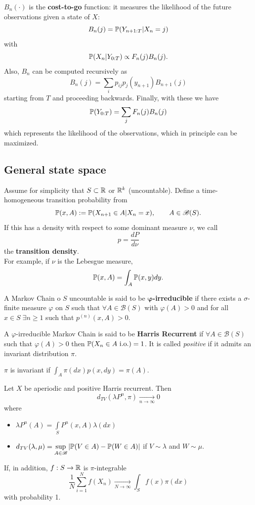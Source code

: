 \documentclass{article}
\begin{document}
$B_n(\cdot)$ is the \textbf{cost-to-go} function: it measures the likelihood of the future observations given a state of $X$:
\[B_n(j)=\mathbb{P}(Y_{n+1:T}|X_n=j)\]
with
\[
\mathbb{P}(X_n|Y_{0:T})\propto F_n(j)B_n(j).
\]
Also, $B_n$ can be computed recursively as
\[B_n(j)=\sum_i p_{ij}p_{j}(y_{n+1})B_{n+1}(j)\]
starting from $T$ and proceeding backwards. Finally, with these we have
\[
\mathbb{P}(Y_{0:T})=\sum_jF_n(j)B_n(j)
\]
which represents the likelihood of the observations, which in principle can be maximized.
\subsection{General state space}
Assume for simplicity that $S\subset\mathbb{R}$ or $\mathbb{R}^k$ (uncountable). Define a time-homogeneous transition probability from 
\[\mathbb{P}(x,A):=\mathbb{P}(X_{n+1}\in A|X_n=x),\qquad A\in\mathscr{B}(S).\]
If this has a density with respect to some dominant measure $\nu$, we call
\[p=\frac{dP}{d\nu}\]
the \textbf{transition density}.\\
For example, if $\nu$ is the Lebesgue measure,
\[\mathbb{P}(x,A)=\int_A \mathbb{P}(x,y)dy.\]
\begin{definition} 
    A Markov Chain o $S$ uncountable is said to be $\mathbf{\varphi}$\textbf{-irreducible} if there exists a $\sigma$-finite measure $\varphi$ on $S$ such that $\forall A\in\mathscr{B}(S)$ with $\varphi(A)>0$ and for all $x\in S\;\exists n\geqslant1$ such that $p^{(n)}(x,A)>0$.
\end{definition}
\begin{definition}
    A $\varphi$-irreducible Markov Chain is said to be \textbf{Harris Recurrent} if $\forall A \in \mathscr{B}(S)$ such that $\varphi(A)>0$ then $\mathbb{P}(X_n\in A \text{ i.o.})=1$. It is called \textit{positive} if it admits an invariant distribution $\pi$.
\end{definition}
$\pi$ is invariant if $\int_A\pi(dx)p(x,dy)=\pi(A)$.
\begin{theorem}
    Let $X$ be aperiodic and positive Harris recurrent. Then
        \[d_{TV}(\lambda P^n,\pi)\xrightarrow[n\to\infty]{}0
        \]
        where
        \begin{itemize}
            \item $\displaystyle\lambda P^n(A)=\int\limits_SP^n(x,A)\lambda(dx)$
            \item $\displaystyle d_{TV}(\lambda,\mu)=\sup\limits_{A\in\mathscr{B}}|\mathbb{P}(V\in A)-\mathbb{P}(W\in A)|$ if $V\sim\lambda$ and $W\sim\mu$.
        \end{itemize}
        If, in addition, $f:S\to\mathbb{R}$ is $\pi$-integrable
        \[
        \frac{1}{N}\sum_{i=1}^Nf(X_n)\xrightarrow[N\to\infty]{}\int_Sf(x)\pi(dx)
        \]
        with probability 1.
\end{theorem}
\end{document}
